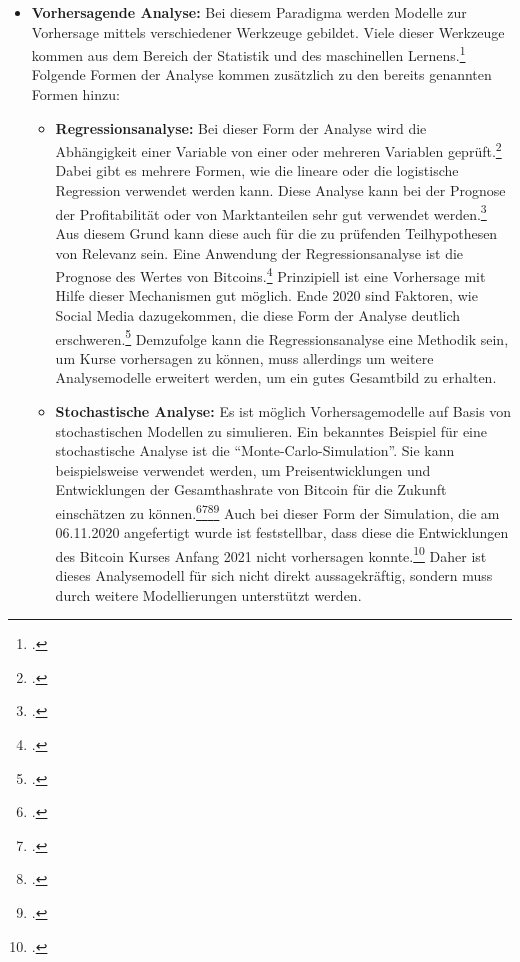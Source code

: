 \begin{itemize}
    \item \textbf{Vorhersagende Analyse: }Bei diesem Paradigma werden Modelle zur Vorhersage mittels verschiedener Werkzeuge
    gebildet. Viele dieser Werkzeuge kommen aus dem Bereich der Statistik und des maschinellen
    Lernens.\footcite[Cf.][Fig. 1]{bihani2014comparative} Folgende Formen der Analyse kommen zusätzlich zu den bereits
    genannten Formen hinzu:
    \begin{itemize}
        \item \textbf{Regressionsanalyse: }Bei dieser Form der Analyse wird die Abhängigkeit einer Variable von einer oder
        mehreren Variablen geprüft.\footcite[Cf.][pp. 97]{bihani2014comparative} Dabei gibt es mehrere Formen, wie die lineare
        oder die logistische Regression verwendet werden kann. Diese Analyse kann bei der Prognose der Profitabilität
        oder von Marktanteilen sehr gut verwendet werden.\footcite[Cf.][p. 99]{bihani2014comparative} Aus diesem Grund kann
        diese auch für die zu prüfenden Teilhypothesen von Relevanz sein. Eine Anwendung der
        Regressionsanalyse ist die Prognose des Wertes von Bitcoins.\footcite[Cf.][p. 19]{ibrahim2020bitcoin} Prinzipiell
        ist eine Vorhersage mit Hilfe dieser Mechanismen gut möglich. Ende 2020 sind Faktoren, wie Social Media dazugekommen,
        die diese Form der Analyse deutlich erschweren.\footcite[Cf.][]{forbes2021musk} Demzufolge kann die Regressionsanalyse eine
        Methodik sein, um Kurse vorhersagen zu können, muss allerdings um weitere Analysemodelle erweitert werden, um ein gutes
        Gesamtbild zu erhalten. 
        \item \textbf{Stochastische Analyse: }Es ist möglich Vorhersagemodelle auf Basis von stochastischen Modellen zu
        simulieren. Ein bekanntes Beispiel für eine stochastische Analyse ist die "`Monte-Carlo-Simulation"'. Sie kann
        beispielsweise verwendet werden, um Preisentwicklungen und Entwicklungen der Gesamthashrate von Bitcoin für die Zukunft
        einschätzen zu
        können.\footcite[Cf.][p. 28]{cocco2016modeling}\footcite[Cf.][]{appendix:mcszenarien}\footcite[Cf.][]{appendix:mcpreis}\footcite[Cf.][]{appendix:mchashrate}
        Auch bei dieser Form der Simulation, die am 06.11.2020 angefertigt wurde ist feststellbar, dass diese die Entwicklungen
        des Bitcoin Kurses Anfang 2021 nicht vorhersagen konnte.\footcite[Cf.][]{appendix:btcusd} Daher ist dieses Analysemodell für sich nicht direkt aussagekräftig,
        sondern muss durch weitere Modellierungen unterstützt werden.
    \end{itemize}


\end{itemize}
